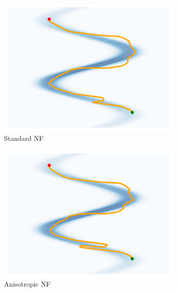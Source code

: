 \begin{figure}[htbp]
\begin{subfigure}[b]{0.18\textwidth}
        \includegraphics[width=\textwidth]{chapter5/results/visualisations/geodesics/standard_normal.png}
        \caption{\scriptsize Standard NF}
        \end{subfigure}
        \begin{subfigure}[b]{0.18\textwidth}
        \includegraphics[width=\textwidth]{chapter5/results/visualisations/geodesics/standard_normal_anisotropic.png}
        \caption{\scriptsize Anisotropic NF}
        \end{subfigure}
        \begin{subfigure}[b]{0.18\textwidth}

\end{subfigure}
\end{figure}

